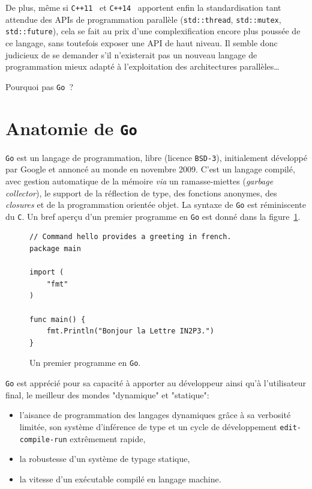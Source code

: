 \documentclass[a4paper,french]{article}
\begin{document}
De plus, m\^eme si \texttt{C++11}~\cite{ref-cxx11} et
\texttt{C++14}~\cite{ref-cxx14} apportent enfin la standardisation tant attendue
des APIs de programmation parall\`ele (\texttt{std::thread},
\texttt{std::mutex}, \texttt{std::future}), cela se fait au prix d'une
complexification encore plus pouss\'ee de ce langage, sans toutefois exposer une
API de haut niveau.
Il semble donc judicieux de se demander s'il n'existerait pas un nouveau langage
de programmation mieux adapt\'e \`a l'exploitation des architectures
parall\`eles\ldots

Pourquoi pas \texttt{Go}~\cite{ref-golang}?

\section{Anatomie de \texttt{Go}}

\texttt{Go} est un langage de programmation, libre (licence \texttt{BSD-3}),
initialement d\'evelopp\'e par Google et annonc\'e au monde en novembre 2009.
C'est un langage compil\'e, avec gestion automatique de la m\'emoire \emph{via} un
ramasse-miettes (\emph{garbage collector}), le support de la r\'eflection de
type, des fonctions anonymes, des \emph{closures} et de la programmation
orient\'ee objet.
La syntaxe de \texttt{Go} est r\'eminiscente du \texttt{C}.
Un bref aper\c cu d'un premier programme en \texttt{Go} est donn\'e dans la
figure~\ref{fig-go-hello}.

\begin{figure}[h]
\begin{verbatim}
// Command hello provides a greeting in french.
package main

import (
	"fmt"
)

func main() {
	fmt.Println("Bonjour la Lettre IN2P3.")
}
\end{verbatim}
\caption{\label{fig-go-hello}Un premier programme en \texttt{Go}.}
\end{figure}

\texttt{Go} est appr\'eci\'e pour sa capacit\'e \`a apporter au d\'eveloppeur
ainsi qu'\`a l'utili\-sa\-teur final, le meilleur des mondes "dynamique" et
"statique":
\begin{itemize}
	\item l'aisance de programmation des langages dynamiques gr\^ace \`a sa
		verbosit\'e limit\'ee, son syst\`eme d'inf\'erence de type et un cycle
		de d\'eveloppement \texttt{edit-compile-run} extr\^emement rapide,
	\item la robustesse d'un syst\`eme de typage statique,
	\item la vitesse d'un ex\'ecutable compil\'e en langage machine.
\end{itemize}
\end{document}
